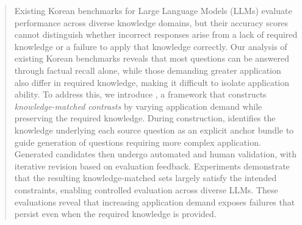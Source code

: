 \begin{abstract}
Existing Korean benchmarks for Large Language Models (LLMs) evaluate performance across diverse knowledge domains, but their accuracy scores cannot distinguish whether incorrect responses arise from a lack of required knowledge or a failure to apply that knowledge correctly.
Our analysis of existing Korean benchmarks reveals that most questions can be answered through factual recall alone, while those demanding greater application also differ in required knowledge, making it difficult to isolate application ability.
To address this, we introduce \name{}, a framework that constructs \textit{knowledge-matched contrasts} by varying application demand while preserving the required knowledge.
During construction, \name{} identifies the knowledge underlying each source question as an explicit anchor bundle to guide generation of questions requiring more complex application.
Generated candidates then undergo automated and human validation, with iterative revision based on evaluation feedback. 
Experiments demonstrate that the resulting knowledge-matched sets largely satisfy the intended constraints, enabling controlled evaluation across diverse LLMs.
These evaluations reveal that increasing application demand exposes failures that persist even when the required knowledge is provided.
\end{abstract}
